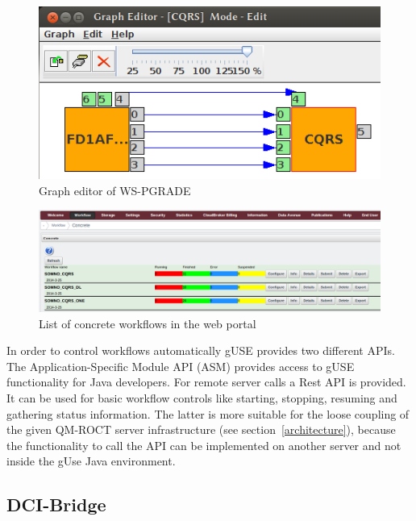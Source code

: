 \begin{figure}%
                \centering
                \includegraphics[width=1.0\columnwidth]{images/graph-editor.png}
                \caption{Graph editor of WS-PGRADE}
                \label{fig:grapheditor}
\end{figure}

\begin{figure}%
                \centering
                \includegraphics[width=2.0\columnwidth]{images/interface-workflows.png}
                \caption{List of concrete workflows in the web portal}
                \label{fig:interfaceworkflows}
\end{figure}

In order to control workflows automatically gUSE provides two different APIs.
The Application-Specific Module API (ASM) provides access to gUSE functionality for Java developers.
For remote server calls a Rest API is provided. It can be used for basic workflow controls like starting, stopping, resuming and gathering status information.
The latter is more suitable for the loose coupling of the given QM-ROCT server infrastructure (see section~\ref{architecture}), because the functionality to call the API can be implemented on another server and not inside the gUse Java environment.

\subsection{DCI-Bridge}\label{dci}

